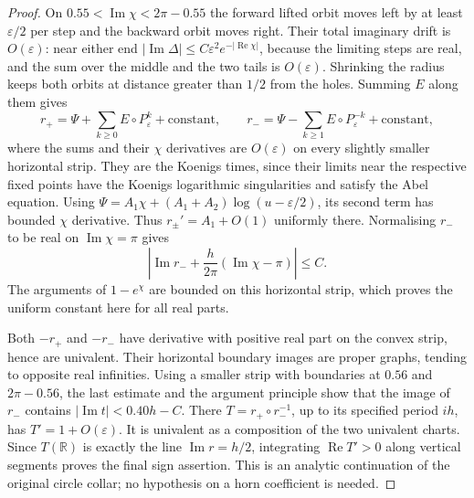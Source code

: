 \documentclass[11pt]{article}
\newcommand{\re}{\operatorname{Re}}
\newcommand{\im}{\operatorname{Im}}
\begin{document}
\begin{proof}
On $0.55<\im\chi<2\pi-0.55$ the forward lifted orbit moves left
by at least $\varepsilon/2$ per step and the backward orbit moves right.
Their total imaginary drift is $O(\varepsilon)$: near either end
$|\im\Delta|\le C\varepsilon^2e^{-|\re\chi|}$, because the limiting
steps are real, and the sum over the middle and the two tails is
$O(\varepsilon)$. Shrinking the radius keeps both orbits at distance
greater than $1/2$ from the holes. Summing $E$ along them gives
\[
 r_+=\Psi+\sum_{k\ge0}E\circ P_\varepsilon^k+\text{constant},\qquad
 r_-=\Psi-\sum_{k\ge1}E\circ P_\varepsilon^{-k}+\text{constant},
\]
where the sums and their $\chi$ derivatives are $O(\varepsilon)$
on every slightly smaller horizontal strip. They are the Koenigs
times, since their limits near the respective fixed points have the
Koenigs logarithmic singularities and satisfy the Abel equation.
Using
$\Psi=A_1\chi+(A_1+A_2)\log(u-\varepsilon/2)$, its second term
has bounded $\chi$ derivative. Thus
$r_\pm'=A_1+O(1)$ uniformly there. Normalising $r_-$ to be real on
$\im\chi=\pi$ gives
\[
 \left|\im r_-+\frac h{2\pi}(\im\chi-\pi)\right|\le C.
\]
The arguments of $1-e^\chi$ are bounded on this horizontal strip,
which proves the uniform constant here for all real parts.

Both $-r_+$ and $-r_-$ have derivative with positive real part on
the convex strip, hence are univalent. Their horizontal boundary
images are proper graphs, tending to opposite real infinities.
Using a smaller strip with boundaries at $0.56$ and $2\pi-0.56$,
the last estimate and the argument principle show that the image of
$r_-$ contains $|\im t|<0.40h-C$.
There $T=r_+\circ r_-^{-1}$, up to its specified period $ih$,
has $T'=1+O(\varepsilon)$. It is univalent as a composition of the
two univalent charts. Since $T(\mathbb R)$ is exactly the line
$\im r=h/2$, integrating $\re T'>0$ along vertical segments proves
the final sign assertion. This is an analytic continuation of the
original circle collar; no hypothesis on a horn coefficient is needed.
\end{proof}
\end{document}
